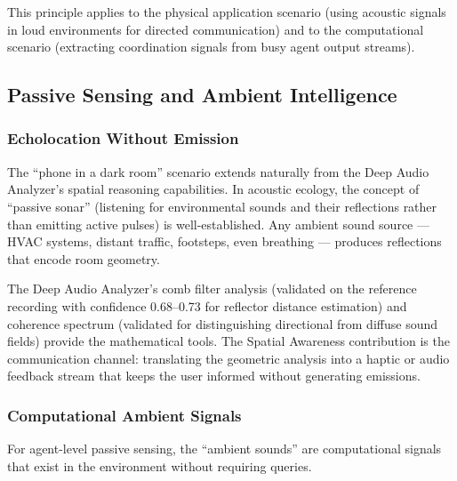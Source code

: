 \documentclass[11pt,letterpaper]{article}
\begin{document}
This principle applies to the physical application scenario (using acoustic signals in loud environments for directed communication) and to the computational scenario (extracting coordination signals from busy agent output streams).

\subsection{Passive Sensing and Ambient Intelligence}

\subsubsection{Echolocation Without Emission}

The ``phone in a dark room'' scenario extends naturally from the Deep Audio Analyzer's spatial reasoning capabilities. In acoustic ecology, the concept of ``passive sonar'' (listening for environmental sounds and their reflections rather than emitting active pulses) is well-established. Any ambient sound source --- HVAC systems, distant traffic, footsteps, even breathing --- produces reflections that encode room geometry.

The Deep Audio Analyzer's comb filter analysis (validated on the reference recording with confidence 0.68--0.73 for reflector distance estimation) and coherence spectrum (validated for distinguishing directional from diffuse sound fields) provide the mathematical tools. The Spatial Awareness contribution is the communication channel: translating the geometric analysis into a haptic or audio feedback stream that keeps the user informed without generating emissions.

\subsubsection{Computational Ambient Signals}

For agent-level passive sensing, the ``ambient sounds'' are computational signals that exist in the environment without requiring queries.
\end{document}
